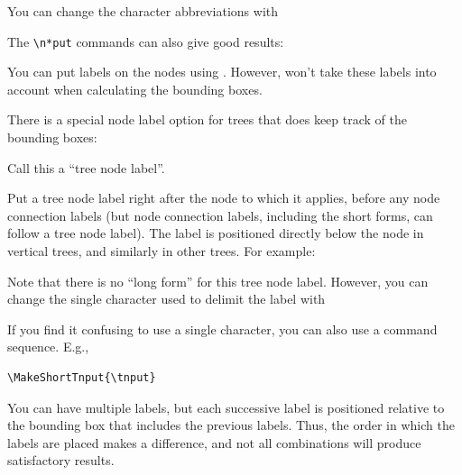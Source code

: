 \documentclass[fontsize=11pt,english,BCOR=10mm,DIV=12,bibliography=totoc,parskip=false,
   headings=small, headinclude=false,footinclude=false,oneside]{pst-doc}
\begin{document}
You can change the character abbreviations with


\begin{BDef}
\end{BDef}

The \verb+\n*put+ commands can also give good results:

\begin{LTXexample}[pos=l,width=0.4\linewidth]
\end{LTXexample}

You can put labels on the nodes using . However,  won't take
these labels into account when calculating the bounding boxes.

There is a special node label option for trees that does keep track of the
bounding boxes:
\begin{BDef}
\Lnotation{\texttildelow}\OptArg*{*}\OptArgs{}
\end{BDef}
Call this a ``tree node label''.

Put a tree node label right after the node to which it applies, before any
node connection labels (but node connection labels, including the short forms,
can follow a tree node label). The label is positioned directly below the node
in vertical trees, and similarly in other trees. For example:


\begin{LTXexample}
\end{LTXexample}

Note that there is no ``long form'' for this tree node label. However, you can
change the single character used to delimit the label with
\begin{BDef}
\end{BDef}
If you find it confusing to use a single character, you can also use a command
sequence. E.g.,

\begin{lstlisting}[style=syntax]
\MakeShortTnput{\tnput}
\end{lstlisting}

You can have multiple labels, but each successive label is positioned relative
to the bounding box that includes the previous labels. Thus, the order in
which the labels are placed makes a difference, and not all combinations will
produce satisfactory results.
\end{document}
